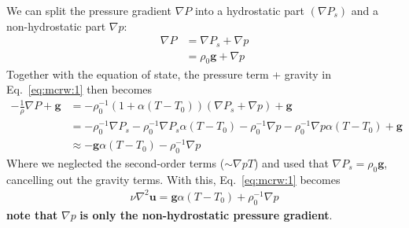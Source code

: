 \documentclass[document.tex]{subfiles}
\begin{document}
\begin{mdframed}
    We can split the pressure gradient $\nabla P$ into a hydrostatic part $(\nabla P_s)$ and a non-hydrostatic part $\nabla p$: 
    \begin{align*}
        \nabla P &= \nabla P_s + \nabla p  \\
        &= \rho_0 \bm{g} + \nabla p
    \end{align*}
    Together with the equation of state, the pressure term + gravity in Eq.~\eqref{eq:mcrw:1} then becomes 
    \begin{align*}
        -\frac{1}{\rho} \nabla P + \bm{g}&= -\rho_0^{-1}(1+\alpha(T-T_0))(\nabla P_s + \nabla p) + \bm{g}\\
        & = -\rho_0^{-1} \nabla P_s  - \rho_0^{-1}\nabla P_s \alpha(T-T_0) - \rho_0^{-1} \nabla p -  \rho_0^{-1} \nabla p \alpha(T-T_0) + \bm{g} \\
        & \approx -\bm{g}\alpha(T-T_0) - \rho_0^{-1}\nabla p
    \end{align*}
    Where we neglected the second-order terms ($\sim \nabla p T$) and used that $\nabla P_s = \rho_0\bm{g}$, cancelling out the gravity terms.
    With this, Eq.~\eqref{eq:mcrw:1} becomes 
    \begin{align} \label{eq:mcrw:10}
        \nu \nabla^2 \bm{u} = \bm{g}\alpha(T-T_0)+\rho_0^{-1}\nabla p
    \end{align} 
    \textbf{note that} $\nabla p$ \textbf{is only the non-hydrostatic pressure gradient}. 


\end{mdframed}
\end{document}

